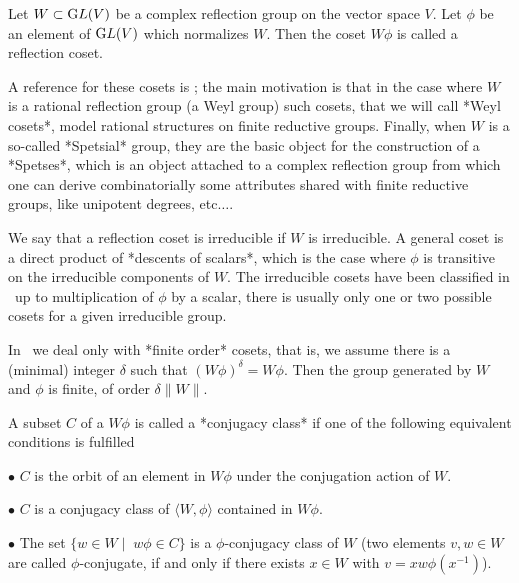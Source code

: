 \def\GL{{\text GL}}

Let $W\subset\GL(V)$ be a complex reflection group on the vector space $V$.
Let  $\phi$ be an element of $\GL(V)$  which normalizes $W$. Then the coset
$W\phi$ is called a reflection coset.

A  reference for these cosets is  \cite{BMM99}; the main motivation is that
in  the case where $W$  is a rational reflection  group (a Weyl group) such
cosets,  that  we  will  call  *Weyl  cosets*, model rational structures on
finite reductive groups. Finally, when $W$ is a so-called *Spetsial* group,
they  are the basic object for the construction of a *Spetses*, which is an
object  attached to  a complex  reflection group  from which one can derive
combinatorially  some attributes shared with  finite reductive groups, like
unipotent degrees, etc$\ldots$.

We  say that  a reflection  coset is  irreducible if  $W$ is irreducible. A
general  coset is a direct  product of *descents of  scalars*, which is the
case  where $\phi$ is transitive on  the irreducible components of $W$. The
irreducible   cosets  have   been  classified   in  \cite{BMM99}\:\  up  to
multiplication  of $\phi$  by a  scalar, there  is usually  only one or two
possible cosets for a given irreducible group.

In  \CHEVIE\ we deal  only with *finite  order* cosets, that  is, we assume
there  is a  (minimal) integer  $\delta$ such  that $(W\phi)^\delta=W\phi$.
Then   the  group  generated  by  $W$   and  $\phi$  is  finite,  of  order
$\delta\|W\|$.

A  subset $C$  of a  $W\phi$ is  called a  *conjugacy class*  if one of the
following equivalent conditions is fulfilled\:

$\bullet$  $C$ is the orbit of an  element in $W\phi$ under the conjugation
action of $W$.

$\bullet$ $C$ is a conjugacy class of $\langle W,\phi \rangle$ contained in
$W\phi$.

$\bullet$  The set $\{w\in W\mid\;w\phi\in C\}$ is a $\phi$-conjugacy class
of $W$ (two elements $v,w\in W$ are called $\phi$-conjugate, if and only if
there exists $x\in W$ with $v = xw\phi(x^{-1})$).

